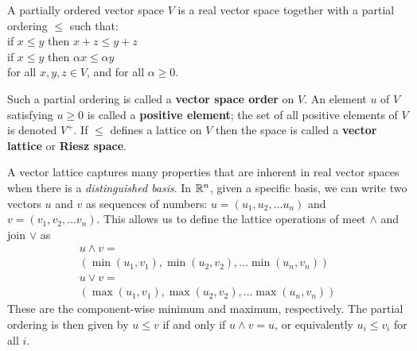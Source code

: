 \begin{definition}
  A partially ordered vector space $V$ is a real vector space together
  with a partial ordering $\le$ such that:\\[5pt]
  \indent if $x \le y$ then $x + z \le y + z$\\[5pt]
  \indent if $x \le y$ then $\alpha x \le \alpha y$
  \vspace{0.1cm}\\[5pt]
  for all $x,y,z \in V$, and for all $\alpha \ge 0$. 
  
  Such a partial
  ordering is called a \textbf{vector space order} on $V$. An element
  $u$ of $V$ satisfying $u \ge 0$ is called a \textbf{positive
    element}; the set of all positive elements of $V$ is denoted
  $V^+$. If $\le$ defines a lattice on $V$ then the space is called a
  \textbf{vector lattice} or \textbf{Riesz space}.
\end{definition}

\begin{example}
  \label{example:finite}
  A vector lattice captures many properties that are inherent in real
  vector spaces when there is a \emph{distinguished basis}. In $\mathbb{R}^n$,
  given a specific basis, we can write two vectors $u$ and $v$ as
  sequences of numbers: $u = (u_1,u_2,\ldots u_n)$ and $v =
  (v_1,v_2,\ldots v_n)$. This allows us to define the lattice
  operations of meet $\land$ and join $\lor$ as
\[\begin{array}{l}
u\land v =\\
(\min(u_1,v_1),\min(u_2,v_2),\ldots \min(u_n,v_n))\\[5pt]
u\lor v = \\
(\max(u_1,v_1),\max(u_2,v_2),\ldots \max(u_n,v_n))
\end{array}\]
These are the component-wise minimum and maximum, respectively. The partial
ordering is then given by $u \le v$ if and only if $u \land v = u$, or
equivalently $u_i \le v_i$ for all $i$.
\end{example}
